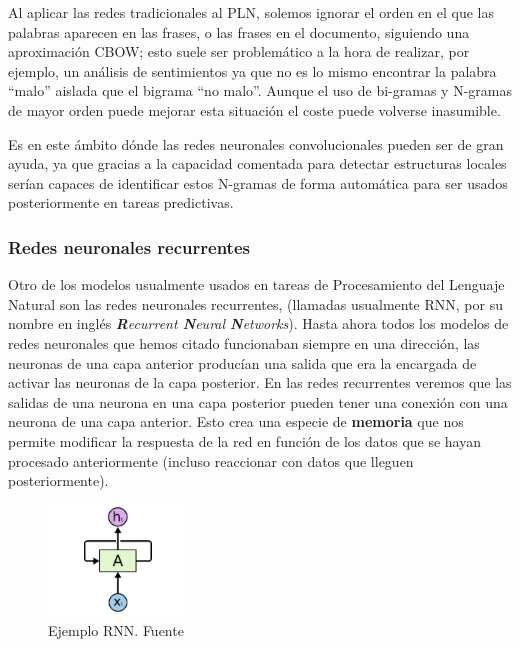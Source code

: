 Al aplicar las redes tradicionales al PLN, solemos ignorar el orden en el que las palabras aparecen en las frases, o las frases en el documento, siguiendo una aproximación CBOW;  esto suele ser problemático a la hora de realizar, por ejemplo, un análisis de sentimientos ya que no es lo mismo encontrar la palabra ``malo'' aislada que el bigrama ``no malo''. Aunque el uso de bi-gramas y N-gramas de mayor orden puede mejorar esta situación el coste puede volverse inasumible. 

Es en este ámbito dónde las redes neuronales convolucionales pueden ser de gran ayuda, ya que gracias a la capacidad comentada para detectar estructuras locales serían capaces de identificar estos N-gramas de forma automática para ser usados posteriormente en tareas predictivas. 




\subsubsection{Redes neuronales recurrentes}
\label{section:arte:arqu:rnn}

Otro de los modelos usualmente usados en tareas de Procesamiento del Lenguaje Natural son las redes neuronales recurrentes, (llamadas usualmente RNN, por su nombre en inglés \textit{\textbf{R}ecurrent \textbf{N}eural \textbf{N}etworks}). Hasta ahora todos los modelos de redes neuronales que hemos citado funcionaban siempre en una dirección, las neuronas de una capa anterior producían una salida que era la encargada de activar las neuronas de la capa posterior. En las redes recurrentes veremos que las salidas de una neurona en una capa posterior pueden tener una conexión con una neurona de una capa anterior. Esto crea una especie de \textbf{memoria} que nos permite modificar la respuesta de la red en función de los datos que se hayan procesado anteriormente (incluso reaccionar con datos que lleguen posteriormente).

\begin{figure}[!ht]
	\centering
	\includegraphics[width=0.32\textwidth]{images/arte/rnn}
	\caption{Ejemplo RNN. Fuente \cite{colahblog}}
	\label{fig:rnn}
\end{figure}


